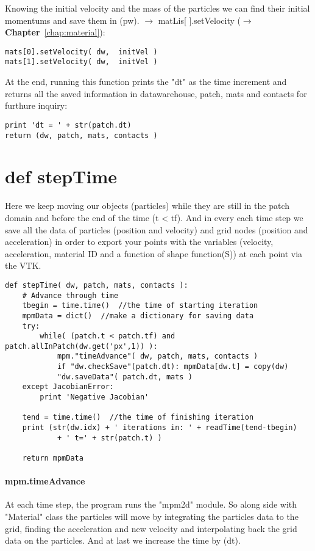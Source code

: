 \documentclass[11pt,fleqn]{book} %
\begin{document}
Knowing the initial velocity and the mass of the particles we can find their initial momentums and save them in (pw). $\rightarrow$ matLis[ ].setVelocity ($\rightarrow$ \textbf{Chapter}~\ref{chap:material}):
\begin{lstlisting}
mats[0].setVelocity( dw,  initVel )
mats[1].setVelocity( dw,  initVel )
\end{lstlisting}

At the end, running this function prints the "dt" as the time increment and returns all the saved information in datawarehouse, patch, mats and contacts for furthure inquiry:
\begin{lstlisting}
print 'dt = ' + str(patch.dt)        
return (dw, patch, mats, contacts )
\end{lstlisting}


\section{def stepTime}
Here we keep moving our objects (particles) while they are still in the patch domain and before the end of the time (t < tf). And in every each time step we save all the data of particles (position and velocity) and grid nodes (position and acceleration) in order to export your points with the variables (velocity, acceleration, material ID and a function of shape function(S)) at each point via the VTK.
\begin{lstlisting}
def stepTime( dw, patch, mats, contacts ):
    # Advance through time
    tbegin = time.time()  //the time of starting iteration
    mpmData = dict()  //make a dictionary for saving data
    try:
        while( (patch.t < patch.tf) and patch.allInPatch(dw.get('px',1)) ):
            mpm."timeAdvance"( dw, patch, mats, contacts )
            if "dw.checkSave"(patch.dt): mpmData[dw.t] = copy(dw)
            "dw.saveData"( patch.dt, mats )
    except JacobianError:
        print 'Negative Jacobian'
            
    tend = time.time()  //the time of finishing iteration 
    print (str(dw.idx) + ' iterations in: ' + readTime(tend-tbegin) 
            + ' t=' + str(patch.t) )
            
    return mpmData
\end{lstlisting}
\paragraph{mpm.timeAdvance}
At each time step, the program runs the "mpm2d" module. So along side with "Material" class the particles will move by integrating the particles data to the grid, finding the acceleration and new velocity and interpolating back the grid data on the particles. And at last we increase the time by (dt).
\end{document}
